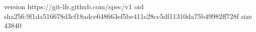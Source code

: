 version https://git-lfs.github.com/spec/v1
oid sha256:9f1da516678d3cf18adce648663ef5be411e28cc5df11310da75b49982ff728f
size 43840
